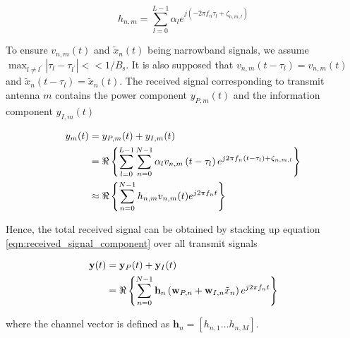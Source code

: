 \begin{equation}\label{eqn:channel}
  {h_{n,m}} = \sum\limits_{l = 0}^{L - 1} {{\alpha _l}{e^{j\left( { - 2\pi {f_n}{\tau _l} + {\zeta _{n,m,l}}} \right)}}}
\end{equation}

To ensure $v_{n, m}(t)$ and $\tilde{x}_{n}(t)$ being narrowband signals, we assume ${\max _{l \ne {l^\prime }}}\left| {{\tau _l} - {\tau _{{l^\prime }}}} \right| <  < 1/{B_{\text{s}}}$. It is also supposed that ${v_{n,m}}\left( {t - {\tau _l}} \right) = {v_{n,m}}(t)$ and ${{\tilde x}_n}\left( {t - {\tau _l}} \right) = {{\tilde x}_n}(t)$. The received signal corresponding to transmit antenna $m$ contains the power component $y_{P, m}(t)$ and the information component $y_{I, m}(t)$

\begin{align}\label{eqn:received_signal_component}
  {y_m}(t) &= {y_{P,m}}(t) + {y_{I,m}}(t) \hfill \\
   &= \Re \left\{ {\sum\limits_{l = 0}^{L - 1} {\sum\limits_{n = 0}^{N - 1} {{\alpha _l}} } {v_{n,m}}\left( {t - {\tau _l}} \right){e^{j2\pi {f_n}\left( {t - {\tau _l}} \right) + {\zeta _{n,m,l}}}}} \right\} \hfill \\
   &\approx \Re \left\{ {\sum\limits_{n = 0}^{N - 1} {{h_{n,m}}} {v_{n,m}}(t){e^{j2\pi {f_n}t}}} \right\} \hfill
\end{align}

Hence, the total received signal can be obtained by stacking up equation \ref{eqn:received_signal_component} over all transmit signals

\begin{align}\label{eqn:received_signal}
  {\mathbf{y}}(t) &= {{\mathbf{y}}_P}(t) + {{\mathbf{y}}_I}(t) \hfill \\
   &= \Re \left\{ {\sum\limits_{n = 0}^{N - 1} {{{\mathbf{h}}_n}} \left( {{{\mathbf{w}}_{P,n}} + {{\mathbf{w}}_{I,n}}{{\tilde x}_n}} \right){e^{j2\pi {f_n}t}}} \right\} \hfill
\end{align}

where the channel vector is defined as ${{\mathbf{h}}_n} = \left[ {{h_{n,1}} \ldots {h_{n,M}}} \right]$. 